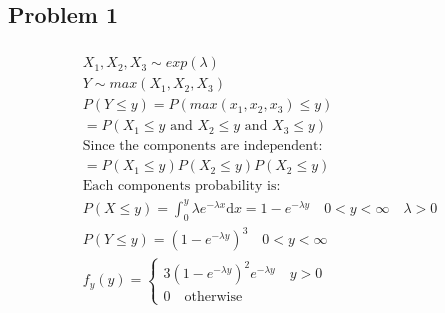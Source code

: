 \documentclass{article}
\newcommand{\dx}{\mathrm{d}x}
\begin{document}
\begin{flushleft}
\section*{Problem 1}
\begin{multline*}\\
X_1,X_2,X_3 \sim exp(\lambda)\\
Y\sim max(X_1,X_2,X_3)\\
P(Y\leq y)=P(max(x_1,x_2,x_3)\leq y)\\
=P(X_1\leq y\text{ and } X_2\leq y\text{ and } X_3 \leq y)\\
\text{Since the components are independent:}\\
=P(X_1\leq y)P(X_2\leq y)P(X_2\leq y)\\
\text{Each components probability is:}\\
P(X\leq y)=\int_{0}^{y}\lambda e^{-\lambda x}\dx= 1-e^{-\lambda y} \quad 0 < y<\infty \quad \lambda > 0\\
P(Y\leq y)=(1-e^{-\lambda y})^3 \quad 0 < y<\infty\\
f_y(y)=\begin{cases}
3(1-e^{-\lambda y})^2 e^{-\lambda y}  \quad y> 0\\
0 \quad \text{otherwise}
\end{cases}\\
\end{multline*}

\end{flushleft}
\end{document}

